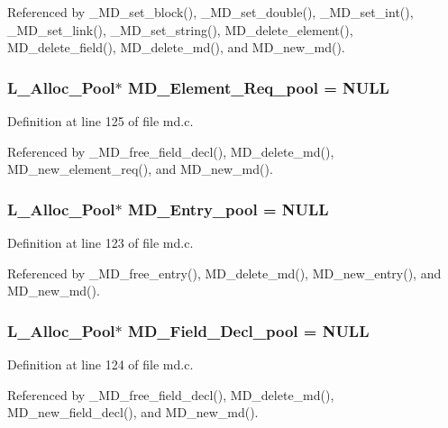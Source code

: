 Referenced by \_\-MD\_\-set\_\-block(), \_\-MD\_\-set\_\-double(), \_\-MD\_\-set\_\-int(), \_\-MD\_\-set\_\-link(), \_\-MD\_\-set\_\-string(), MD\_\-delete\_\-element(), MD\_\-delete\_\-field(), MD\_\-delete\_\-md(), and MD\_\-new\_\-md().
\subsubsection{\setlength{\rightskip}{0pt plus 5cm}\bf{L\_\-Alloc\_\-Pool}$\ast$ \bf{MD\_\-Element\_\-Req\_\-pool} = NULL\hspace{0.3cm}{\tt  [static]}}\label{md_8c_d10ce8e0a2e563fa6fd048eb4426d834}




Definition at line 125 of file md.c.

Referenced by \_\-MD\_\-free\_\-field\_\-decl(), MD\_\-delete\_\-md(), MD\_\-new\_\-element\_\-req(), and MD\_\-new\_\-md().
\subsubsection{\setlength{\rightskip}{0pt plus 5cm}\bf{L\_\-Alloc\_\-Pool}$\ast$ \bf{MD\_\-Entry\_\-pool} = NULL\hspace{0.3cm}{\tt  [static]}}\label{md_8c_c63101f2267dc65e0387ae90f1bfc4bc}




Definition at line 123 of file md.c.

Referenced by \_\-MD\_\-free\_\-entry(), MD\_\-delete\_\-md(), MD\_\-new\_\-entry(), and MD\_\-new\_\-md().
\subsubsection{\setlength{\rightskip}{0pt plus 5cm}\bf{L\_\-Alloc\_\-Pool}$\ast$ \bf{MD\_\-Field\_\-Decl\_\-pool} = NULL\hspace{0.3cm}{\tt  [static]}}\label{md_8c_3508bf13a70e573364b344ee5fdc2905}




Definition at line 124 of file md.c.

Referenced by \_\-MD\_\-free\_\-field\_\-decl(), MD\_\-delete\_\-md(), MD\_\-new\_\-field\_\-decl(), and MD\_\-new\_\-md().
